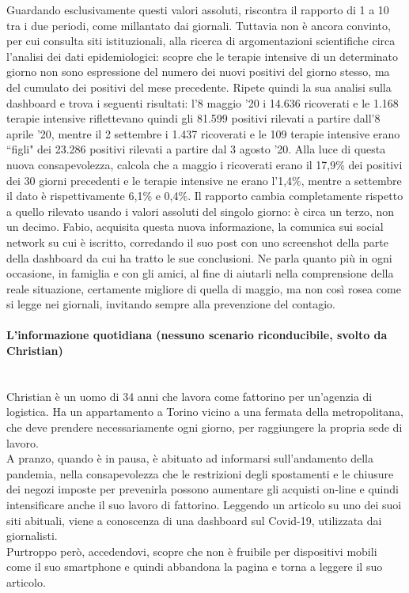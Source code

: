 Guardando esclusivamente questi valori assoluti, riscontra il rapporto di 1 a 10 tra i due periodi, come millantato dai giornali.
Tuttavia non è ancora convinto, per cui consulta siti istituzionali, alla ricerca di argomentazioni scientifiche circa l'analisi dei dati epidemiologici: scopre che le terapie intensive di un determinato giorno non sono espressione del numero dei nuovi positivi del giorno stesso, ma del cumulato dei positivi del mese precedente.
Ripete quindi la sua analisi sulla dashboard e trova i seguenti risultati: l'8 maggio '20 i 14.636 ricoverati e le 1.168 terapie intensive riflettevano quindi gli 81.599 positivi rilevati a partire dall'8 aprile '20, mentre il 2 settembre i 1.437 ricoverati e le 109 terapie intensive erano ``figli" dei 23.286 positivi rilevati a partire dal 3 agosto '20.
Alla luce di questa nuova consapevolezza, calcola che a maggio i ricoverati erano il 17,9\% dei positivi dei 30 giorni precedenti e le terapie intensive ne erano l'1,4\%, mentre a settembre il dato è rispettivamente 6,1\% e 0,4\%.
Il rapporto cambia completamente rispetto a quello rilevato usando i valori assoluti del singolo giorno: è circa un terzo, non un decimo.
Fabio, acquisita questa nuova informazione, la comunica sui social network su cui è iscritto, corredando il suo post con uno screenshot della parte della dashboard da cui ha tratto le sue conclusioni.
Ne parla quanto più in ogni occasione, in famiglia e con gli amici, al fine di aiutarli nella comprensione della reale situazione, certamente migliore di quella di maggio, ma non così rosea come si legge nei giornali, invitando sempre alla prevenzione del contagio.
\noindent
\paragraph{L'informazione quotidiana (nessuno scenario riconducibile, svolto da Christian)}\mbox{}\\
Christian è un uomo di 34 anni che lavora come fattorino per un'agenzia di logistica.
Ha un appartamento a Torino vicino a una fermata della metropolitana, che deve prendere necessariamente ogni giorno, per raggiungere la propria sede di lavoro.\\
A pranzo, quando è in pausa, è abituato ad informarsi sull'andamento della pandemia, nella consapevolezza che le restrizioni degli spostamenti e le chiusure dei negozi imposte per prevenirla possono aumentare gli acquisti on-line e quindi intensificare anche il suo lavoro di fattorino.
Leggendo un articolo su uno dei suoi siti abituali, viene a conoscenza di una dashboard sul Covid-19, utilizzata dai giornalisti.\\
Purtroppo però, accedendovi, scopre che non è fruibile per dispositivi mobili come il suo smartphone e quindi abbandona la pagina e torna a leggere il suo articolo.
\noindent
